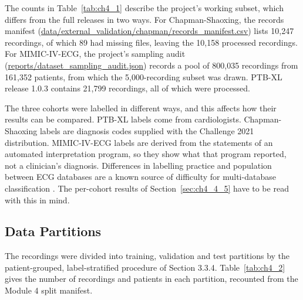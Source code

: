 The counts in Table~\ref{tab:ch4_1} describe the project's working subset, which differs from the full releases in two ways. For Chapman-Shaoxing, the records manifest (\url{data/external_validation/chapman/records_manifest.csv}) lists 10,247 recordings, of which 89 had missing files, leaving the 10,158 processed recordings. For MIMIC-IV-ECG, the project's sampling audit (\url{reports/dataset_sampling_audit.json}) records a pool of 800,035 recordings from 161,352 patients, from which the 5,000-recording subset was drawn. PTB-XL release 1.0.3 contains 21,799 recordings, all of which were processed.

The three cohorts were labelled in different ways, and this affects how their results can be compared. PTB-XL labels come from cardiologists. Chapman-Shaoxing labels are diagnosis codes supplied with the Challenge 2021 distribution. MIMIC-IV-ECG labels are derived from the statements of an automated interpretation program, so they show what that program reported, not a clinician's diagnosis. Differences in labelling practice and population between ECG databases are a known source of difficulty for multi-database classification \cite{REYNA2022ISSUES}. The per-cohort results of Section~\ref{sec:ch4_4_5} have to be read with this in mind.

\subsection{Data Partitions}\label{sec:ch4_1_2}

The recordings were divided into training, validation and test partitions by the patient-grouped, label-stratified procedure of Section 3.3.4. Table~\ref{tab:ch4_2} gives the number of recordings and patients in each partition, recounted from the Module 4 split manifest.

